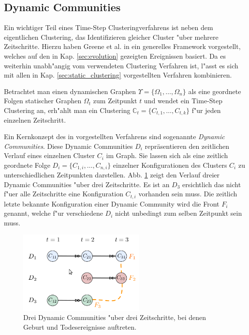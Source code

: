 \documentclass[journal]{vgtc}
\begin{document}
    
  \subsection{Dynamic Communities}
    Ein wichtiger Teil eines Time-Step Clusteringverfahrens ist neben dem eigentlichen Clustering, das Identifizieren gleicher Cluster
    "uber mehrere Zeitschritte. Hierzu haben Greene et al. in \cite{timestep} ein generelles Framework vorgestellt, welches auf den
    in Kap. \ref{sec:evolution} gezeigten Ereignissen basiert. Da es weiterhin unabh"angig vom verwendeten Clustering Verfahren ist,
    l"asst es sich mit allen in Kap. \ref{sec:static_clustering} vorgestellten Verfahren kombinieren.
    
    Betrachtet man einen dynamischen Graphen $\Upsilon = \{ \Omega_1, \dots, \Omega_n \}$ als eine geordnete Folgen statischer
    Graphen $\Omega_t$ zum Zeitpunkt $t$ und wendet ein Time-Step Clustering an, erh"ahlt man ein Clustering
    $\mathbb{C}_t = \{ C_{t,1}, \dots, C_{t,k}\}$ f"ur jeden einzelnen Zeitschritt.
    
    Ein Kernkonzept des in \cite{timestep} vorgestellten Verfahrens sind sogenannte \emph{Dynamic Communities}. Diese Dynamic
    Communities $D_i$ repräsentieren den zeitlichen Verlauf eines einzelnen Cluster $C_i$ im Graph. Sie lassen sich als eine zeitlich 
    geordnete Folge $D_i = \{ C_{1,i}, \dots, C_{n,i} \}$ einzelner Konfigurationen des Clusters $C_i$ zu unterschiedlichen Zeitpunkten
    darstellen. Abb. \ref{fig:dynamic1} zeigt den Verlauf dreier Dynamic Communities "uber drei Zeitschritte. Es ist an $D_3$ ersichtlich das
    nicht f"uer alle Zeitschritte eine Konfiguration $C_{t,i}$ vorhanden sein muss. Die zeitlich letzte bekannte Konfiguration
    einer Dynamic Community wird die Front $F_i$ genannt, welche f"ur verschiedene $D_i$ nicht unbedingt zum selben Zeitpunkt sein muss.
    \begin{figure}[h]
      \centering
      \includegraphics[width=2.5in]{images/dynamic_communities1}
      \caption{\label{fig:dynamic1} Drei Dynamic Communities "uber drei Zeitschritte, bei denen Geburt und Todesereignisse auftreten.\cite{timestep}}
    \end{figure}
    
\end{document}
